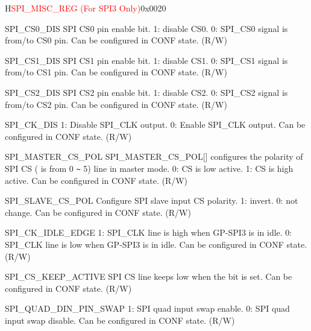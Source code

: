 \begin{register}{H}{\textcolor{red}{SPI\_MISC\_REG (For SPI3 Only)}}{0x{}0020}\label{regdesc:SPI3MISCREG}
%
%
%
%
%
%
%
%
%
%
%
%
\regnewline%
\begin{regdesc}\begin{reglist}
\label{fielddesc:SPI3CS0DIS}\item [SPI\_CS0\_DIS] SPI CS0 pin enable bit. 1: disable CS0. 0: SPI\_CS0 signal is from/to CS0 pin. Can be configured in CONF state. (R/W)
\label{fielddesc:SPI3CS1DIS}\item [SPI\_CS1\_DIS] SPI CS1 pin enable bit. 1: disable CS1. 0: SPI\_CS1 signal is from/to CS1 pin. Can be configured in CONF state. (R/W)
\label{fielddesc:SPI3CS2DIS}\item [SPI\_CS2\_DIS] SPI CS2 pin enable bit. 1: disable CS2. 0: SPI\_CS2 signal is from/to CS2 pin. Can be configured in CONF state. (R/W)
\label{fielddesc:SPI3CKDIS}\item [SPI\_CK\_DIS] 1: Disable SPI\_CLK output. 0: Enable SPI\_CLK output. Can be configured in CONF state. (R/W)
\label{fielddesc:SPI3MASTERCSPOL}\item [SPI\_MASTER\_CS\_POL] SPI\_MASTER\_CS\_POL[] configures the polarity of SPI CS ( is from 0 \verb+~+ 5) line in master mode.
0: CS is low active. 1: CS is high active. Can be configured in CONF state. (R/W)
\label{fielddesc:SPI3SLAVECSPOL}\item [SPI\_SLAVE\_CS\_POL] Configure SPI slave input CS polarity. 1: invert. 0: not change. Can be configured in CONF state. (R/W)
\label{fielddesc:SPI3CKIDLEEDGE}\item [SPI\_CK\_IDLE\_EDGE] 1: SPI\_CLK line is high when GP-SPI3 is in idle. 0: SPI\_CLK line is low when GP-SPI3 is in idle. Can be configured in CONF state. (R/W)
\label{fielddesc:SPI3CSKEEPACTIVE}\item [SPI\_CS\_KEEP\_ACTIVE] SPI CS line keeps low when the bit is set. Can be configured in CONF state. (R/W)
\label{fielddesc:SPI3QUADDINPINSWAP}\item [SPI\_QUAD\_DIN\_PIN\_SWAP] 1: SPI quad input swap enable. 0: SPI quad input swap disable. Can be configured in CONF state. (R/W)
\end{reglist}\end{regdesc}
\end{register}


